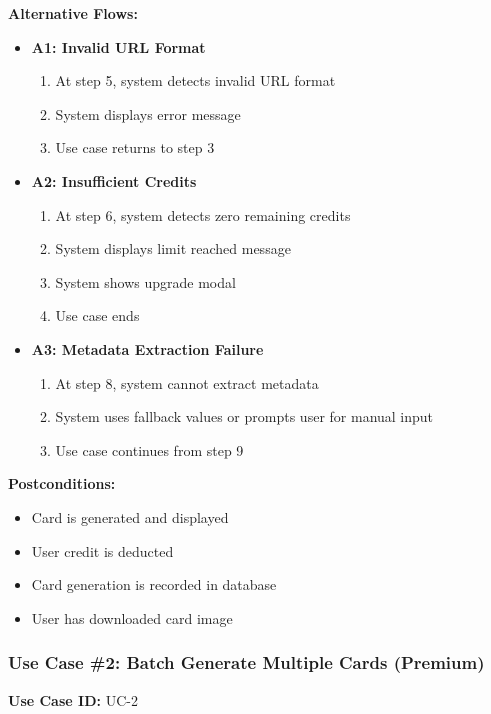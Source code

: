 \documentclass[12pt,a4paper]{article}
\begin{document}
\textbf{Alternative Flows:}
\begin{itemize}
    \item \textbf{A1: Invalid URL Format}
        \begin{enumerate}
            \item At step 5, system detects invalid URL format
            \item System displays error message
            \item Use case returns to step 3
        \end{enumerate}
    \item \textbf{A2: Insufficient Credits}
        \begin{enumerate}
            \item At step 6, system detects zero remaining credits
            \item System displays limit reached message
            \item System shows upgrade modal
            \item Use case ends
        \end{enumerate}
    \item \textbf{A3: Metadata Extraction Failure}
        \begin{enumerate}
            \item At step 8, system cannot extract metadata
            \item System uses fallback values or prompts user for manual input
            \item Use case continues from step 9
        \end{enumerate}
\end{itemize}

\textbf{Postconditions:}
\begin{itemize}
    \item Card is generated and displayed
    \item User credit is deducted
    \item Card generation is recorded in database
    \item User has downloaded card image
\end{itemize}

\subsubsection{Use Case \#2: Batch Generate Multiple Cards (Premium)}

\textbf{Use Case ID:} UC-2
\end{document}
